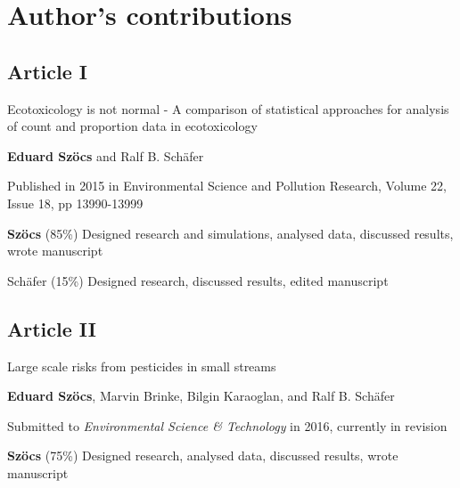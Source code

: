 

\chapter{Author's contributions}



\begin{sloppypar}

\section*{Article I}
\vspace{-1em}
\small
\begin{description}
    \setlength\itemsep{0em}
	\item[Title:] Ecotoxicology is not normal - A comparison of statistical approaches for analysis of count and proportion data in ecotoxicology
	\item[Authors:] \textbf{Eduard Szöcs} and Ralf B. Schäfer
	\item[Status:] Published in 2015 in Environmental Science and Pollution Research, Volume 22, Issue 18, pp 13990-13999
	\item[Contributions:] \textbf{Szöcs} (85\%) Designed research and simulations, analysed data, discussed results, wrote manuscript 

	Schäfer (15\%) Designed research, discussed results, edited manuscript
\end{description}
\normalsize
\vfill

\section*{Article II}
\vspace{-1em}
\small
\begin{description}
    \setlength\itemsep{0em}
	\item[Title:] Large scale risks from pesticides in small streams
	\item[Authors:] \textbf{Eduard Szöcs}, Marvin Brinke, Bilgin Karaoglan, and Ralf B. Schäfer
	\item[Status:] Submitted to \emph{Environmental Science \& Technology} in 2016, currently in revision
	\item[Contributions:] \textbf{Szöcs} (75\%) Designed research, analysed data, discussed results, wrote manuscript


\end{description}
\end{sloppypar}

